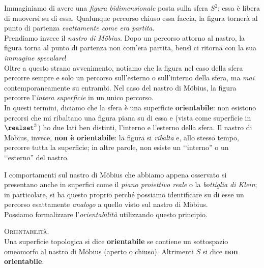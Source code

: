 \begin{intuit}
	Immaginiamo di avere una \textit{figura bidimensionale} posta sulla sfera $S^2$; essa è libera di muoversi su di essa. Qualunque percorso chiuso essa faccia, la figura tornerà al punto di partenza \textit{esattamente come era partita}.\\
	Prendiamo invece il \textit{nastro di Möbius}. Dopo un percorso attorno al nastro, la figura torna al punto di partenza non com'era partita, bensì ci ritorna con la sua \textit{immagine speculare}!\\
	Oltre a questo strano avvenimento, notiamo che la figura nel caso della sfera percorre sempre e solo un percorso sull'esterno o sull'interno della sfera, ma \textit{mai} contemporaneamente su entrambi. Nel caso del nastro di Möbius, la figura percorre l'\textit{intera superficie} in un unico percorso.\\
	In questi termini, diciamo che la sfera è una superficie \textbf{orientabile}: non esistono percorsi che mi ribaltano una figura piana su di essa e (vista come superficie in $\realset^3$) ho due lati ben distinti, l'interno e l'esterno della sfera. Il nastro di Möbius, invece, \textbf{non è orientabile}: la figura si \textit{ribalta} e, allo stesso tempo, percorre tutta la superficie; in altre parole, non esiste un ‘‘interno'' o un ‘‘esterno'' del nastro.
\end{intuit}
I comportamenti sul nastro di Möbius che abbiamo appena osservato si presentano anche in superfici come il \textit{piano proiettivo reale} o la \textit{bottiglia di Klein}; in particolare, si ha questo proprio perché possiamo identificare su di esse un percorso esattamente \textit{analogo} a quello visto sul nastro di Möbius.\\
Possiamo formalizzare l'\textit{orientabilità} utilizzando questo principio.
\begin{define}\textsc{Orientabilità.}\\
	Una superficie topologica si dice \textbf{orientabile} se contiene un sottospazio omeomorfo al nastro di Möbius (aperto o chiuso). Altrimenti $S$ si dice \textbf{non orientabile}.
\end{define}
